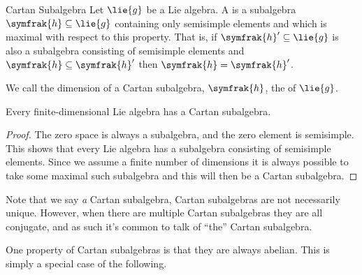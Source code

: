 \documentclass[fleqn]{NotesClass}
\newcommand{\csa}{\symfrak{h}}
\begin{document}
    \begin{dfn}{Cartan Subalgebra}{}
        Let \(\lie{g}\) be a Lie algebra.
        A  is a subalgebra \(\csa \subseteq \lie{g}\) containing only semisimple elements and which is maximal with respect to this property.
        That is, if \(\csa' \subseteq \lie{g}\) is also a subalgebra consisting of semisimple elements and \(\csa \subseteq \csa'\) then \(\csa = \csa'\).
        
        We call the dimension of a Cartan subalgebra, \(\csa\), the  of \(\lie{g}\).
    \end{dfn}
    
    \begin{lma}{}{}
        Every finite-dimensional Lie algebra has a Cartan subalgebra.
        \begin{proof}
            The zero space is always a subalgebra, and the zero element is semisimple.
            This shows that every Lie algebra has a subalgebra consisting of semisimple elements.
            Since we assume a finite number of dimensions it is always possible to take some maximal such subalgebra and this will then be a Cartan subalgebra.
        \end{proof}
    \end{lma}
    
    Note that we say \emph{a} Cartan subalgebra, Cartan subalgebras are not necessarily unique.
    However, when there are multiple Cartan subalgebras they are all conjugate, and as such it's common to talk of \enquote{the} Cartan subalgebra.
    
    One property of Cartan subalgebras is that they are always abelian.
    This is simply a special case of the following.
    
\end{document}
